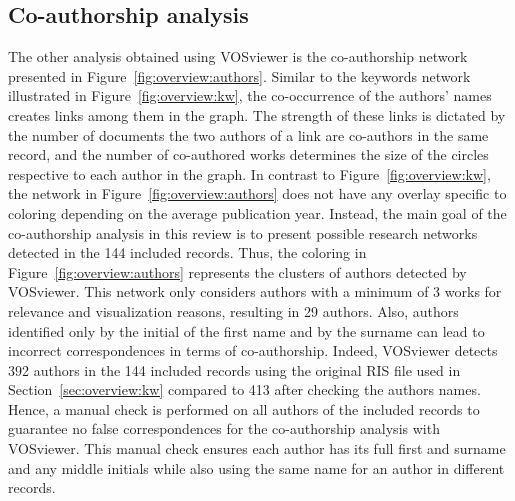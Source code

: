\subsection{Co-authorship analysis}
\label{sec:overview:authors}

The other analysis obtained using VOSviewer is the co-authorship network presented in Figure~\ref{fig:overview:authors}. Similar to the keywords network illustrated in Figure~\ref{fig:overview:kw}, the co-occurrence of the authors' names creates links among them in the graph. The strength of these links is dictated by the number of documents the two authors of a link are co-authors in the same record, and the number of co-authored works determines the size of the circles respective to each author in the graph. 
In contrast to Figure~\ref{fig:overview:kw}, the network in Figure~\ref{fig:overview:authors} does not have any overlay specific to coloring depending on the average publication year. Instead, the main goal of the co-authorship analysis in this review is to present possible research networks detected in the 144 included records. Thus, the coloring in Figure~\ref{fig:overview:authors} represents the clusters of authors detected by VOSviewer. This network only considers authors with a minimum of 3 works for relevance and visualization reasons, resulting in 29 authors.
Also, authors identified only by the initial of the first name and by the surname can lead to incorrect correspondences in terms of co-authorship. Indeed, VOSviewer detects 392 authors in the 144 included records using the original RIS file used in Section~\ref{sec:overview:kw} compared to 413 after checking the authors names. Hence, a manual check is performed on all authors of the included records to guarantee no false correspondences for the co-authorship analysis with VOSviewer. This manual check ensures each author has its full first and surname and any middle initials while also using the same name for an author in different records.

